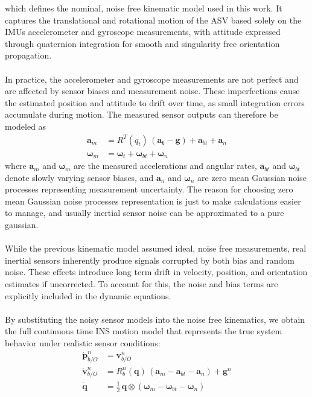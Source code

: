 which defines the nominal, noise free kinematic model used in this work. It captures the translational and rotational motion of the ASV based solely on the IMUs accelerometer and gyroscope measurements, with attitude expressed through quaternion integration for smooth and singularity free orientation propagation.
\\ \\
In practice, the accelerometer and gyroscope measurements are not perfect and are affected by sensor biases and measurement noise. These imperfections cause the estimated position and attitude to drift over time, as small integration errors accumulate during motion. The measured sensor outputs can therefore be modeled as
$$
\begin{aligned}
    \mathbf{a}_m &= R^{T}(q_t)\,(\mathbf{a_t} - \mathbf{g}) + \mathbf{a}_{bt} + \mathbf{a}_{n} \\
    \boldsymbol{\omega}_m &= \boldsymbol{\omega}_t + \mathbf{\omega}_{bt} + \mathbf{\omega}_{n}
\end{aligned}
$$
where $\mathbf{a}_m$ and $\boldsymbol{\omega}_m$ are the measured accelerations and angular rates, $\mathbf{a}_{bt}$ and $\mathbf{\omega}_{bt}$ denote slowly varying sensor biases, and $\mathbf{a}_{n}$ and $\mathbf{\omega}_{n}$ are zero mean Gaussian noise processes representing measurement uncertainty. The reason for choosing zero mean Gaussian noise processes representation is just to make calculations easier to manage, and usually inertial sensor noise can be approximated to a pure gaussian.  
\\ \\
While the previous kinematic model assumed ideal, noise free measurements, real inertial sensors inherently produce signals corrupted by both bias and random noise. These effects introduce long term drift in velocity, position, and orientation estimates if uncorrected. To account for this, the noise and bias terms are explicitly included in the dynamic equations.  
\\ \\
By substituting the noisy sensor models into the noise free kinematics, we obtain the full continuous time INS motion model that represents the true system behavior under realistic sensor conditions:
$$
\begin{aligned}
    \dot{\mathbf{p}}_{b/O}^{n} &= \mathbf{v}_{b/O}^{n} \\
    \dot{\mathbf{v}}_{b/O}^{n} &= R_b^n(\mathbf{q})\,(\mathbf{a}_m - \mathbf{a}_{bt} - \mathbf{a}_n) + \mathbf{g}^n \\
    \dot{\mathbf{q}} &= \tfrac{1}{2}\,\mathbf{q} \otimes (\boldsymbol{\omega}_m - \mathbf{\omega}_{bt} - \mathbf{\omega}_n)
\end{aligned}
$$
